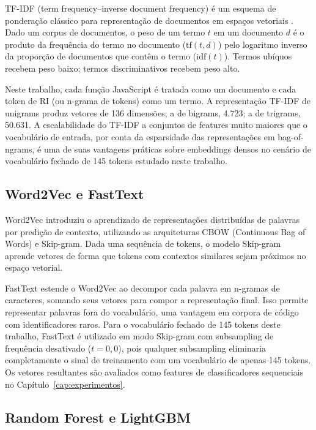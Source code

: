TF-IDF (term frequency--inverse document frequency) é um esquema de
ponderação clássico para representação de documentos em espaços vetoriais
\cite{manning2008}. Dado um corpus de documentos, o peso de um termo $t$ em um
documento $d$ é o produto da frequência do termo no documento
($\text{tf}(t,d)$) pelo logaritmo inverso da proporção de documentos que contêm o
termo ($\text{idf}(t)$). Termos ubíquos recebem peso baixo; termos discriminativos
recebem peso alto.

Neste trabalho, cada função JavaScript é tratada como um documento e cada token de
RI (ou n-grama de tokens) como um termo. A representação TF-IDF de unigrams produz
vetores de 136 dimensões; a de bigrams, 4.723; a de trigrams, 50.631. A
escalabilidade do TF-IDF a conjuntos de features muito maiores que o vocabulário de
entrada, por conta da esparsidade das representações em bag-of-ngrams, é uma de suas vantagens práticas sobre embeddings densos no cenário de vocabulário
fechado de 145 tokens estudado neste trabalho.

\subsection{Word2Vec e FastText}
\label{sub:embeddings}

Word2Vec \cite{mikolov2013} introduziu o aprendizado de representações distribuídas
de palavras por predição de contexto, utilizando as arquiteturas CBOW
(Continuous Bag of Words) e Skip-gram. Dada uma sequência de tokens,
o modelo Skip-gram aprende vetores de forma que tokens com contextos
similares sejam próximos no espaço vetorial.

FastText \cite{bojanowski2017} estende o Word2Vec ao decompor cada palavra em
n-gramas de caracteres, somando seus vetores para compor a representação final.
Isso permite representar palavras fora do vocabulário, uma vantagem em corpora
de código com identificadores raros. Para o vocabulário fechado de 145 tokens deste
trabalho, FastText é utilizado em modo Skip-gram com subsampling de
frequência desativado ($t = 0{,}0$), pois qualquer subsampling eliminaria
completamente o sinal de treinamento com um vocabulário de apenas 145 tokens. Os
vetores resultantes são avaliados como features de classificadores sequenciais no
Capítulo~\ref{cap:experimentos}.

\subsection{Random Forest e LightGBM}
\label{sub:rf-lgbm}

